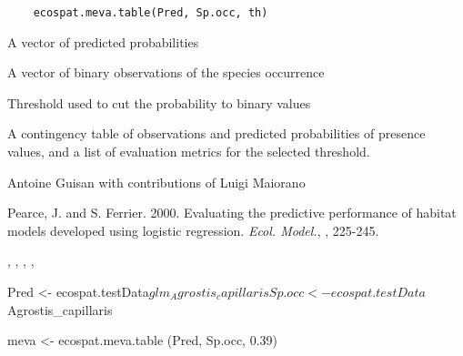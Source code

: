 \documentclass[a4paper]{book}
\begin{document}
%
\begin{Usage}
\begin{verbatim}
    ecospat.meva.table(Pred, Sp.occ, th)
\end{verbatim}
\end{Usage}
%
\begin{Arguments}
\begin{ldescription}
\item[\code{Pred}] 
A vector of predicted probabilities

\item[\code{Sp.occ}] 
A vector of binary observations of the species occurrence

\item[\code{th}] 
Threshold used to cut the probability to binary values

\end{ldescription}
\end{Arguments}
%
\begin{Value}
A contingency table of observations and predicted probabilities of presence values, and a list of evaluation metrics for the selected threshold.
\end{Value}
%
\begin{Author}\relax
Antoine Guisan  with contributions of Luigi Maiorano 
\end{Author}
%
\begin{References}\relax
Pearce, J. and S. Ferrier. 2000. Evaluating the predictive performance of habitat models developed using logistic regression. \emph{Ecol. Model.}, , 225-245.
\end{References}
%
\begin{SeeAlso}\relax
{}, , , , 

\end{SeeAlso}
%
\begin{Examples}
\begin{ExampleCode}

Pred <- ecospat.testData$glm_Agrostis_capillaris
Sp.occ <- ecospat.testData$Agrostis_capillaris

meva <- ecospat.meva.table (Pred, Sp.occ, 0.39)
\end{ExampleCode}
\end{Examples}
\end{document}
